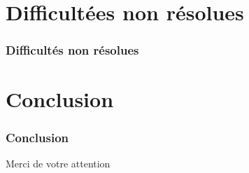 \documentclass[9pt]{beamer}
\begin{document}
\section{Difficultées non résolues}
\begin{frame}
  \frametitle{Difficultés non résolues}
\end{frame}

\section{Conclusion}
\begin{frame}
  \frametitle{Conclusion}
  Merci de votre attention
\end{frame}
\end{document}
